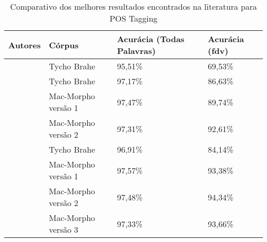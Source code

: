 \begin{table}[!htb]
\footnotesize
\centering
\caption{Comparativo dos melhores resultados encontrados na literatura para POS Tagging}
\label{tab:comparacaotrabsrelac}
\begin{tabular}{llP{3cm}P{3cm}}
  \toprule
  \textbf{Autores} & \textbf{Córpus} & \textbf{Acurácia (Todas Palavras)} & \textbf{Acurácia (\ac{fdv})} \\
  \midrule
  \centering
   & Tycho Brahe & 95,51\% & 69,53\% \\
   		 & Tycho Brahe & 97,17\% & 86,63\% \\
   		 & Mac-Morpho versão 1 & 97,47\% & 89,74\% \\
   		 & Mac-Morpho versão 2 & 97,31\% & 92,61\% \\
    & Tycho Brahe & 96,91\% & 84,14\% \\
    & Mac-Morpho versão 1 & 97,57\% & 93,38\% \\
    & Mac-Morpho versão 2 & 97,48\% & 94,34\% \\
    & Mac-Morpho versão 3 & 97,33\% & 93,66\% \\
  \bottomrule
\end{tabular}
\end{table}


